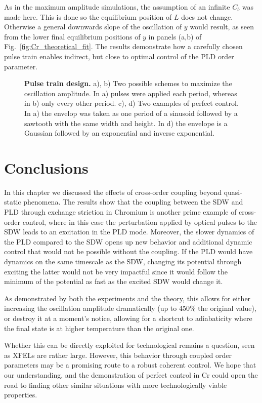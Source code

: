 As in the maximum amplitude simulations, the assumption of an infinite $C_b$ was made here.
This is done so the equilibrium position of $L$ does not change.
Otherwise a general downwards slope of the oscillation of $y$ would result, as seen from the lower final equilibrium positions of $y$ in panels (a,b) of Fig.~\ref{fig:Cr_theoretical_fit}.
The results demonstrate how a carefully chosen pulse train enables indirect, but close to optimal control of the PLD order parameter.
\begin{figure}
	\caption{\label{fig:Cr_control} {\bf Pulse train design.} a), b) Two possible schemes to maximize the oscillation amplitude. In a) pulses were applied each period, whereas in b) only every other period. c), d) Two examples of perfect control. In a) the envelop was taken as one period of a sinusoid followed by a sawtooth with the same width and height. In d) the envelope is a Gaussian followed by an exponential and inverse exponential.}
\end{figure}

\section{Conclusions}
In this chapter we discussed the effects of cross-order coupling beyond quasi-static phenomena.
The results show that the coupling between the SDW and PLD through exchange striction in Chromium is another prime example of cross-order control, where in this case the perturbation applied by optical pulses to the SDW leads to an excitation in the PLD mode.
Moreover, the slower dynamics of the PLD compared to the SDW opens up new behavior and additional dynamic control that would not be possible without the coupling.
If the PLD would have dynamics on the same timescale as the SDW, changing its potential through exciting the latter would not be very impactful since it would follow the minimum of the potential as fast as the excited SDW would change it.

As demonstrated by both the experiments and the theory, this allows for either increasing the oscillation amplitude dramatically (up to 450\% the original value), or destroy it at a moment's notice, allowing for a shortcut to adiabaticity where the final state is at higher temperature than the original one.

Whether this can be directly exploited for technological remains a question, seen as XFELs are rather large.
However, this behavior through coupled order parameters may be a promising route to a robust coherent control.
We hope that our understanding, and the demonstration of perfect control in Cr could open the road to finding other similar situations with more technologically viable properties.   
